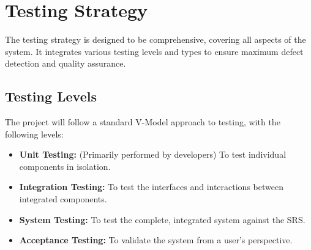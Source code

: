 \documentclass{article}
\begin{document}
\section{Testing Strategy}

The testing strategy is designed to be comprehensive, covering all aspects of the system. It integrates various testing levels and types to ensure maximum defect detection and quality assurance.

\subsection{Testing Levels}
The project will follow a standard V-Model approach to testing, with the following levels:
\begin{itemize}
    \item \textbf{Unit Testing:} (Primarily performed by developers) To test individual components in isolation.
    \item \textbf{Integration Testing:} To test the interfaces and interactions between integrated components.
    \item \textbf{System Testing:} To test the complete, integrated system against the SRS.
    \item \textbf{Acceptance Testing:} To validate the system from a user's perspective.
\end{itemize}
\end{document}
